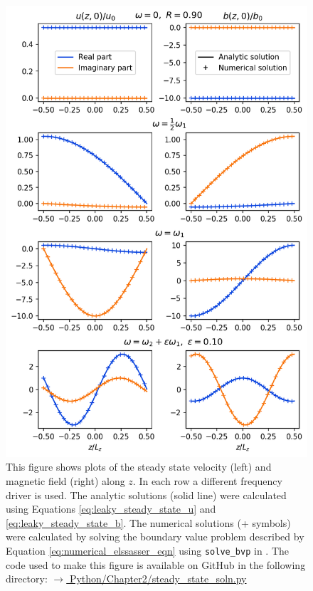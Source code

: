 \begin{figure}
    \centering
    \vspace{-20pt}
    \includegraphics[width=\textwidth,height=0.85\textheight,keepaspectratio]{figures/chapter02/steady_state_soln_along_z.png}
    \vspace{-10pt}
    \caption{This figure shows plots of the steady state velocity (left) and magnetic field (right) along $z$. In each row a different frequency driver is used. The analytic solutions (solid line) were calculated using Equations \eqref{eq:leaky_steady_state_u} and \eqref{eq:leaky_steady_state_b}. The numerical solutions (+ symbols) were calculated by solving the boundary value problem described by Equation \eqref{eq:numerical_elssasser_eqn} using \texttt{solve\_bvp} in \citet{SciPy2020}. The code used to make this figure is available on GitHub in the following directory:\newline
    \href{https://github.com/aleksyprok/apkp_thesis/blob/main/Python/Chapter2/steady_state_soln.py}{$\rightarrow$ Python/Chapter2/steady\_state\_soln.py}}
    \vspace{-30pt}
    \label{fig:steady_state_soln_along_z}
\end{figure}

